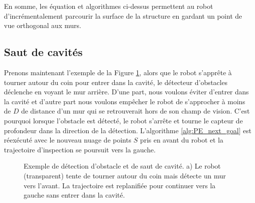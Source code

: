 En somme, les équation et algorithmes ci-dessus permettent au robot d'incrémentalement parcourir la surface de la structure en gardant un point de vue orthogonal aux murs.

\subsection{Saut de cavités}
\label{subsec:ugv_cavity_skip}

Prenons maintenant l'exemple de la Figure \ref{fig:ugv_exploration}, alors que le robot s'apprête à tourner autour du coin pour entrer dans la cavité, le détecteur d'obstacles déclenche en voyant le mur arrière. D'une part, nous voulons éviter d'entrer dans la cavité et d'autre part nous voulons empêcher le robot de s'approcher à moins de $D$ de distance d'un mur qui se retrouverait hors de son champ de vision. C'est pourquoi lorsque l'obstacle est détecté, le robot s'arrête et tourne le capteur de profondeur dans la direction de la détection. L'algorithme \ref{alg:PE_next_goal} est réexécuté avec le nouveau nuage de points $S$ pris en avant du robot et la trajectoire d'inspection se poursuit vers la gauche.

\begin{figure}[ht]
\centering
{}
\hfil
{}
\caption{ 
Exemple de détection d'obstacle et de saut de cavité. a) Le robot (transparent) tente de tourner autour du coin mais détecte un mur vers l'avant. La trajectoire est replanifiée pour continuer vers la gauche sans entrer dans la cavité.}
\label{fig:ugv_exploration}
\end{figure}


